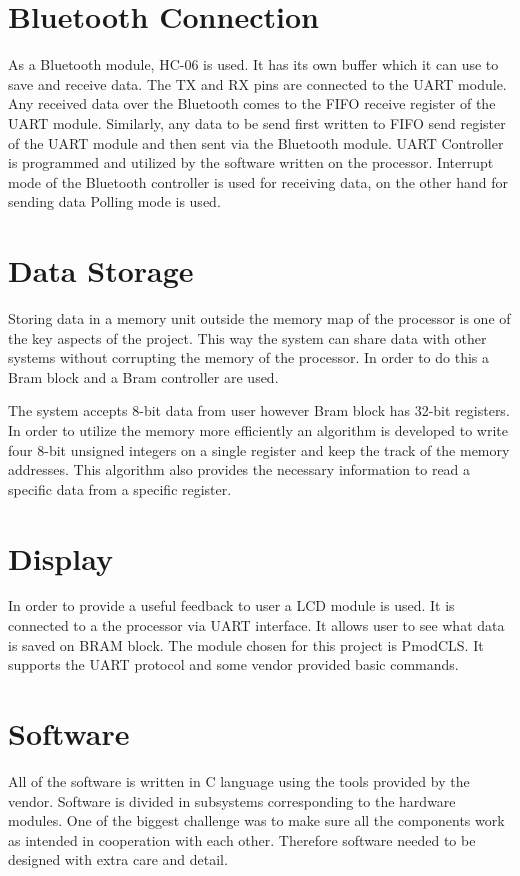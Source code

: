 \section{Bluetooth Connection} 
As a Bluetooth module, HC-06 is used. It has its own buffer which it can use to save and receive data. The TX and RX pins are connected to the UART module. Any received data over the Bluetooth comes to the FIFO receive register of the UART module. Similarly, any data to be send first written to FIFO send register of the UART module and then sent via the Bluetooth module. UART Controller is programmed and utilized by the software written on the processor. Interrupt mode of the Bluetooth controller is used for receiving data, on the other hand for sending data Polling mode is used.

\section{Data Storage}
Storing data in a memory unit outside the memory map of the processor is one of the key aspects of the project. This way the system can share data with other systems without corrupting the memory of the processor. In order to do this a Bram block and a Bram controller are used.

The system accepts 8-bit data from user however Bram block has 32-bit registers. In order to utilize the memory more efficiently an algorithm is developed to write four 8-bit unsigned integers on a single register and keep the track of the memory addresses. This algorithm also provides the necessary information to read a specific data from a specific register.

\section{Display}
In order to provide a useful feedback to user a LCD module is used. It is connected to a the processor via UART interface. It allows user to see what data is saved on BRAM block.
The module chosen for this project is PmodCLS. It supports the UART protocol and some vendor provided basic commands. 

\section{Software}
All of the software is written in C language using the tools provided by the vendor. Software is divided in subsystems corresponding to the hardware modules. 
One of the biggest challenge was to make sure all the components work as intended in cooperation with each other. Therefore software needed to be designed with extra care and detail. 
 
